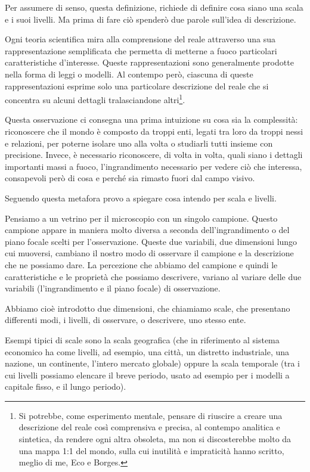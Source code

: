 \documentclass[a4paper, headings=standardclasses]{scrartcl}
\begin{document}
Per assumere di senso, questa definizione, richiede di definire cosa siano una scala e i suoi livelli. Ma prima di fare ciò spenderò due parole sull'idea di descrizione.

Ogni teoria scientifica mira alla comprensione del reale attraverso una sua rappresentazione semplificata che permetta di metterne a fuoco particolari caratteristiche d'interesse. Queste rappresentazioni sono generalmente prodotte nella forma di leggi o modelli.
Al contempo però, ciascuna di queste rappresentazioni esprime solo una particolare descrizione del reale che si concentra su alcuni dettagli tralasciandone altri\footnote{Si potrebbe, come esperimento mentale, pensare di riuscire a creare una descrizione del reale così comprensiva e precisa, al contempo analitica e sintetica, da rendere ogni altra obsoleta, ma non si discosterebbe molto da una mappa 1:1 del mondo, sulla cui inutilità e impraticità hanno scritto, meglio di me, Eco e Borges.}.

Questa osservazione ci consegna una prima intuizione su cosa sia la complessità: riconoscere che il mondo è composto da troppi enti, legati tra loro da troppi nessi e relazioni, per poterne isolare uno alla volta o studiarli tutti insieme con precisione. Invece, è necessario riconoscere, di volta in volta, quali siano i dettagli importanti massi a fuoco, l'ingrandimento necessario per vedere ciò che interessa, consapevoli però di cosa e perché sia rimasto fuori dal campo visivo.

Seguendo questa metafora provo a spiegare cosa intendo per scala e livelli.

Pensiamo a un vetrino per il microscopio con un singolo campione. Questo campione appare
in maniera molto diversa a seconda dell'ingrandimento o del piano focale scelti per l'osservazione.
Queste due variabili, due dimensioni lungo cui muoversi, cambiano il nostro modo di osservare il campione e la descrizione che ne possiamo dare.
La percezione che abbiamo del campione e quindi le caratteristiche e le proprietà che possiamo
descrivere, variano al variare delle due variabili (l'ingrandimento e il piano focale) di osservazione.

Abbiamo cioè introdotto due dimensioni, che chiamiamo scale, che presentano differenti modi, i livelli, di osservare, o descrivere, uno stesso ente.

Esempi tipici di scale sono la scala geografica (che in riferimento al sistema economico ha come livelli, ad esempio, una città, un distretto industriale, una nazione, un continente, l'intero
mercato globale) oppure la scala temporale (tra i cui livelli possiamo elencare il breve periodo, usato ad esempio per i modelli a capitale fisso, e il lungo periodo).
\end{document}
